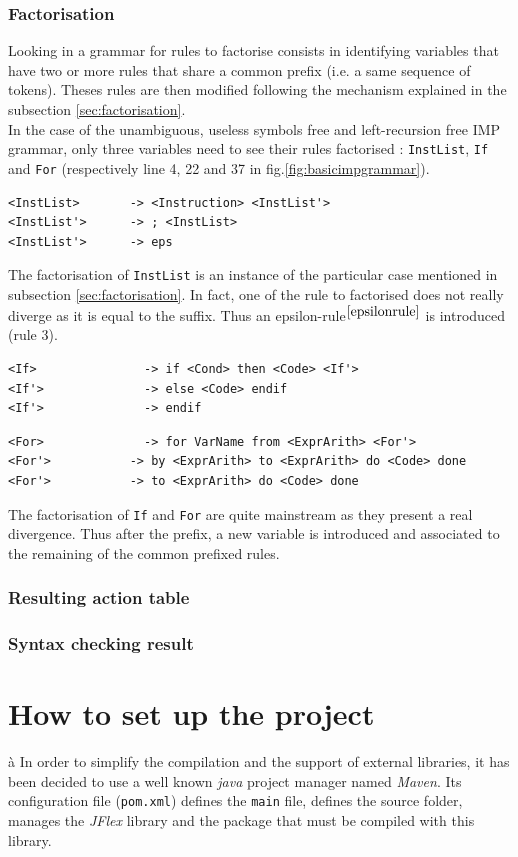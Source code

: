 \documentclass[a4paper,11pt]{article}
\begin{document}
    \subsubsection{Factorisation}
      Looking in a grammar for rules to factorise consists in identifying variables that have two or more rules that share a common prefix (i.e. a same sequence of tokens). Theses rules are then modified following the mechanism explained in the subsection \ref{sec:factorisation}.\\
      In the case of the unambiguous, useless symbols free and left-recursion free IMP grammar, only three variables need to see their rules factorised : \verb|InstList|, \verb|If| and \verb|For| (respectively line 4, 22 and 37 in fig.\ref{fig:basicimpgrammar}).
      \begin{lstlisting}
<InstList>	     -> <Instruction> <InstList'> 
<InstList'>	     -> ; <InstList> 
<InstList'>	     -> eps\end{lstlisting}
      The factorisation of \verb|InstList| is an instance of the particular case mentioned in subsection \ref{sec:factorisation}. In fact, one of the rule to factorised does not really diverge as it is equal to the suffix. Thus an epsilon-rule$^{\ref{epsilonrule}}$ is introduced (rule 3).
      \begin{lstlisting}
<If>	           -> if <Cond> then <Code> <If'> 
<If'>	           -> else <Code> endif 
<If'>	           -> endif\end{lstlisting}
      \begin{lstlisting}
<For>	           -> for VarName from <ExprArith> <For'> 
<For'>	         -> by <ExprArith> to <ExprArith> do <Code> done 
<For'>	         -> to <ExprArith> do <Code> done\end{lstlisting}
      The factorisation of \verb|If| and \verb|For| are quite mainstream as they present a real divergence. Thus after the prefix,  a new variable is introduced and associated to the remaining of the common prefixed rules.
      
    \subsubsection{Resulting action table}
    
    \subsubsection{Syntax checking result}  

\section{How to set up the project}à
  In order to simplify the compilation and the support of external libraries, it has been decided to use a well known \textit{java} project manager named \textit{Maven}. Its configuration file (\verb|pom.xml|) defines the \verb|main| file, defines the source folder, manages the \textit{JFlex} library and the package that must be compiled with this library.
\end{document}
